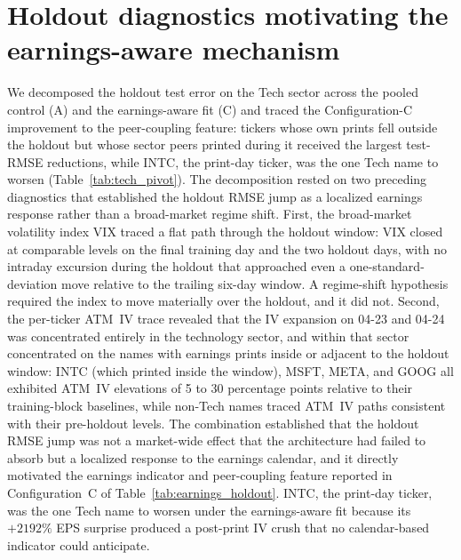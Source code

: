 \section{Holdout diagnostics motivating the earnings-aware mechanism}\label{sec:supp_earnings_diag}

We decomposed the holdout test error on the Tech sector across the pooled control (A) and the earnings-aware fit (C) and traced the Configuration-C improvement to the peer-coupling feature: tickers whose own prints fell outside the holdout but whose sector peers printed during it received the largest test-RMSE reductions, while INTC, the print-day ticker, was the one Tech name to worsen (Table~\ref{tab:tech_pivot}). The decomposition rested on two preceding diagnostics that established the holdout RMSE jump as a localized earnings response rather than a broad-market regime shift. First, the broad-market volatility index VIX traced a flat path through the holdout window: VIX closed at comparable levels on the final training day and the two holdout days, with no intraday excursion during the holdout that approached even a one-standard-deviation move relative to the trailing six-day window. A regime-shift hypothesis required the index to move materially over the holdout, and it did not. Second, the per-ticker ATM~IV trace revealed that the IV expansion on 04-23 and 04-24 was concentrated entirely in the technology sector, and within that sector concentrated on the names with earnings prints inside or adjacent to the holdout window: INTC (which printed inside the window), MSFT, META, and GOOG all exhibited ATM~IV elevations of 5 to 30 percentage points relative to their training-block baselines, while non-Tech names traced ATM~IV paths consistent with their pre-holdout levels. The combination established that the holdout RMSE jump was not a market-wide effect that the architecture had failed to absorb but a localized response to the earnings calendar, and it directly motivated the earnings indicator and peer-coupling feature reported in Configuration~C of Table~\ref{tab:earnings_holdout}. INTC, the print-day ticker, was the one Tech name to worsen under the earnings-aware fit because its $+2192\%$ EPS surprise produced a post-print IV crush that no calendar-based indicator could anticipate.

